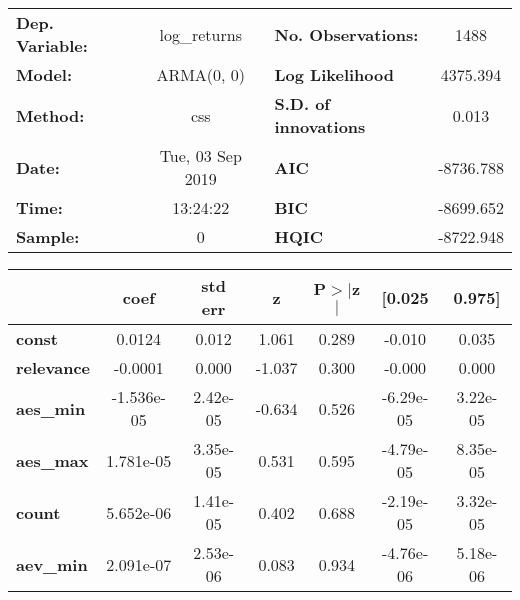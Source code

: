 \begin{center}
\begin{tabular}{lclc}
\toprule
\textbf{Dep. Variable:} &   log\_returns   & \textbf{  No. Observations:  } &    1488     \\
\textbf{Model:}         &    ARMA(0, 0)    & \textbf{  Log Likelihood     } &  4375.394   \\
\textbf{Method:}        &       css        & \textbf{  S.D. of innovations} &   0.013     \\
\textbf{Date:}          & Tue, 03 Sep 2019 & \textbf{  AIC                } & -8736.788   \\
\textbf{Time:}          &     13:24:22     & \textbf{  BIC                } & -8699.652   \\
\textbf{Sample:}        &        0         & \textbf{  HQIC               } & -8722.948   \\
\bottomrule
\end{tabular}
\begin{tabular}{lcccccc}
                   & \textbf{coef} & \textbf{std err} & \textbf{z} & \textbf{P$> |$z$|$} & \textbf{[0.025} & \textbf{0.975]}  \\
\midrule
\textbf{const}     &       0.0124  &        0.012     &     1.061  &         0.289        &       -0.010    &        0.035     \\
\textbf{relevance} &      -0.0001  &        0.000     &    -1.037  &         0.300        &       -0.000    &        0.000     \\
\textbf{aes\_min}  &   -1.536e-05  &     2.42e-05     &    -0.634  &         0.526        &    -6.29e-05    &     3.22e-05     \\
\textbf{aes\_max}  &    1.781e-05  &     3.35e-05     &     0.531  &         0.595        &    -4.79e-05    &     8.35e-05     \\
\textbf{count}     &    5.652e-06  &     1.41e-05     &     0.402  &         0.688        &    -2.19e-05    &     3.32e-05     \\
\textbf{aev\_min}  &    2.091e-07  &     2.53e-06     &     0.083  &         0.934        &    -4.76e-06    &     5.18e-06     \\
\bottomrule
\end{tabular}
\end{center}

